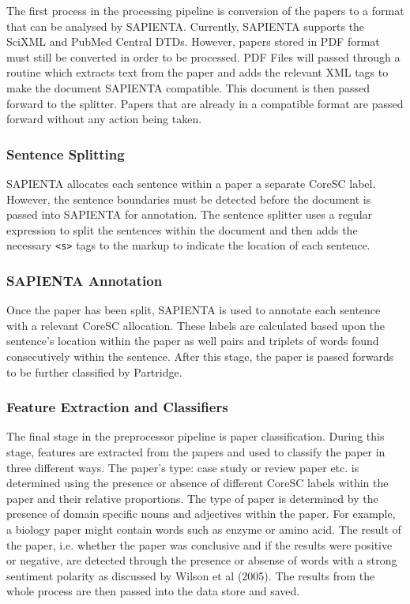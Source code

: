 The first process in the processing pipeline is conversion of the papers to a
format that can be analysed by SAPIENTA. Currently, SAPIENTA supports the
SciXML\cite{rupp2006flexible} and PubMed Central\cite{pubmedDTD} DTDs. However,
papers stored in PDF format must still be converted in order to be processed.
PDF Files will passed through a routine which extracts text from the paper and
adds the relevant XML tags to make the document SAPIENTA compatible. This
document is then passed forward to the splitter. Papers that are already in a
compatible format are passed forward without any action being taken.

\subsubsection{Sentence Splitting} 

SAPIENTA allocates each sentence within a paper a separate CoreSC label.
However, the sentence boundaries must be detected before the document is passed
into SAPIENTA for annotation. The sentence splitter uses a regular expression
to split the sentences within the document and then adds the necessary
\verb|<s>| tags to the markup to indicate the location of each sentence.

\subsubsection{SAPIENTA Annotation}

Once the paper has been split, SAPIENTA is used to annotate each sentence with
a relevant CoreSC allocation. These labels are calculated based upon the
sentence's location within the paper as well pairs and triplets of words found
consecutively within the sentence. After this stage, the paper is passed
forwards to be further classified by Partridge.


\subsubsection{Feature Extraction and Classifiers}

The final stage in the preprocessor pipeline is paper classification. During
this stage, features are extracted from the papers and used to classify the
paper in three different ways. The paper's type: case study or review paper
etc. is determined using the presence or absence of different CoreSC labels
within the paper and their relative proportions. The type of paper is
determined by the presence of domain specific nouns and adjectives within the
paper. For example, a biology paper might contain words such as enzyme or amino
acid. The result of the paper, i.e. whether the paper was conclusive and if the
results were positive or negative, are detected through the presence or absense
of words with a strong sentiment polarity as discussed by Wilson et al
(2005)\cite{Wilson05Polarity}. The results from the whole process are then
passed into the data store and saved.

